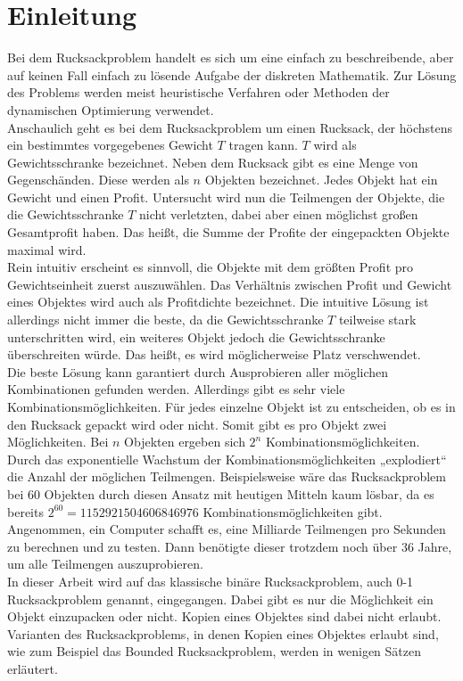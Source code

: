 
\chapter{Einleitung}
Bei dem Rucksackproblem handelt es sich um eine einfach zu beschreibende, aber auf keinen Fall einfach zu lösende Aufgabe der diskreten Mathematik. Zur Lösung des Problems werden meist heuristische Verfahren oder Methoden der dynamischen Optimierung verwendet. \cite[vgl.][]{Luderer2017} \\
Anschaulich geht es bei dem Rucksackproblem um einen Rucksack, der höchstens ein bestimmtes vorgegebenes Gewicht $T$ tragen kann. $T$ wird als Gewichtsschranke bezeichnet. Neben dem Rucksack gibt es eine Menge von Gegenschänden. Diese werden als $n$ Objekten bezeichnet. Jedes Objekt hat ein Gewicht und einen Profit. Untersucht wird nun die Teilmengen der Objekte, die die Gewichtsschranke $T$ nicht verletzten, dabei aber einen möglichst großen Gesamtprofit haben. Das heißt, die Summe der Profite der eingepackten Objekte maximal wird. \\
Rein intuitiv erscheint es sinnvoll, die Objekte mit dem größten Profit pro Gewichtseinheit zuerst auszuwählen. Das Verhältnis zwischen Profit und Gewicht eines Objektes wird auch als Profitdichte bezeichnet. Die intuitive Lösung ist allerdings nicht immer die beste, da die Gewichtsschranke $T$ teilweise stark unterschritten wird, ein weiteres Objekt jedoch die Gewichtsschranke überschreiten würde. Das heißt, es wird möglicherweise Platz verschwendet.\\
Die beste Lösung kann garantiert durch Ausprobieren aller möglichen Kombinationen gefunden werden. Allerdings gibt es sehr viele Kombinationsmöglichkeiten. Für jedes einzelne Objekt ist zu entscheiden, ob es in den Rucksack gepackt wird oder nicht. Somit gibt es pro Objekt zwei Möglichkeiten. Bei $n$ Objekten ergeben sich $2^n$ Kombinationsmöglichkeiten. Durch das exponentielle Wachstum der Kombinationsmöglichkeiten „explodiert“ die Anzahl der möglichen Teilmengen. Beispielsweise wäre das Rucksackproblem bei 60 Objekten durch diesen Ansatz mit heutigen Mitteln kaum lösbar, da es bereits $2^{60} = 1 152 921 504 606 846 976$ Kombinationsmöglichkeiten gibt. Angenommen, ein Computer schafft es, eine Milliarde Teilmengen pro Sekunden zu berechnen und zu testen. Dann benötigte dieser trotzdem noch über 36 Jahre, um alle Teilmengen auszuprobieren. \cite[vgl.][]{Vocking2008} \\
In dieser Arbeit wird auf das klassische binäre Rucksackproblem, auch 0-1 Rucksackproblem genannt, eingegangen. Dabei gibt es nur die Möglichkeit ein Objekt einzupacken oder nicht. Kopien eines Objektes sind dabei nicht erlaubt. Varianten des Rucksackproblems, in denen Kopien eines Objektes erlaubt sind, wie zum Beispiel das Bounded Rucksackproblem, werden in wenigen Sätzen erläutert.

